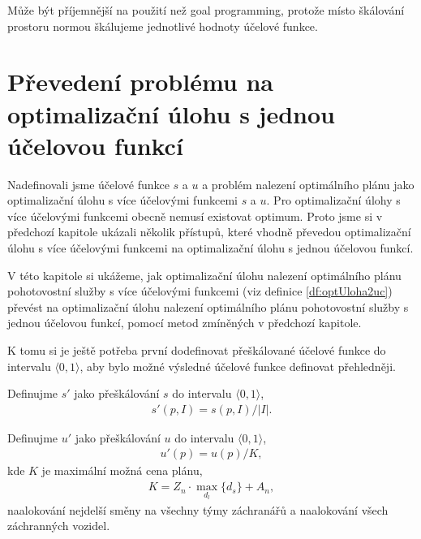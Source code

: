 Může být příjemnější na použití než goal programming, protože místo škálování prostoru normou škálujeme jednotlivé hodnoty účelové funkce.

\section{Převedení problému na optimalizační úlohu s jednou účelovou funkcí}\label{kap:opt1Uc}

Nadefinovali jsme účelové funkce $s$ a $u$ a problém nalezení optimálního plánu jako optimalizační úlohu s více účelovými funkcemi $s$ a $u$.
Pro optimalizační úlohy s více účelovými funkcemi obecně nemusí existovat optimum.
Proto jsme si v předchozí kapitole ukázali několik přístupů,
které vhodně převedou optimalizační úlohu s více účelovými funkcemi na optimalizační úlohu s jednou účelovou funkcí.

V této kapitole si ukážeme, jak optimalizační úlohu nalezení optimálního plánu pohotovostní služby s více účelovými funkcemi (viz definice \ref{df:optUloha2uc}) převést na
optimalizační úlohu nalezení optimálního plánu pohotovostní služby s jednou účelovou funkcí, pomocí metod zmíněných v předchozí kapitole.

K tomu si je ještě potřeba první dodefinovat přeškálované účelové funkce do intervalu $\langle 0, 1 \rangle$, aby
bylo možné výsledné účelové funkce definovat přehledněji.
\begin{definice} \label{df:simulaceSkal}
  Definujme $s'$ jako přeškálování $s$ do intervalu $\langle 0, 1 \rangle$,
  \begin{align*}
    s'(p, I) = s(p, I) / |I|.
  \end{align*}
\end{definice}
\begin{definice} \label{df:cenaPlanuSkal}
  Definujme $u'$ jako přeškálování $u$ do intervalu $\langle 0, 1 \rangle$,
  \begin{align*}
    u'(p) = u(p) / K,
  \end{align*}
  kde $K$ je maximální možná cena plánu,
  \begin{align*}
    K = Z_n \cdot \max_{d_l} \{ d_s \} + A_n,
  \end{align*}
  naalokování nejdelší směny na všechny týmy záchranářů a naalokování všech záchranných vozidel.
\end{definice}

